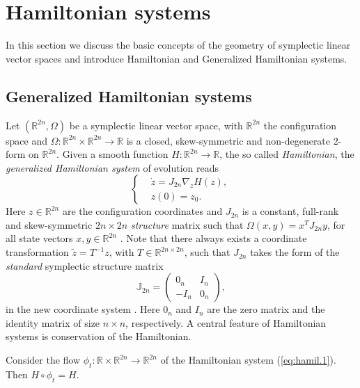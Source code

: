 \section{Hamiltonian systems}
\label{sec:hamil}

In this section we discuss the basic concepts of the geometry of symplectic linear vector spaces and introduce Hamiltonian and Generalized Hamiltonian systems.

\subsection{Generalized Hamiltonian systems}
\label{sec:hamil.1}

Let $(\mathbb R^{2n}, \Omega)$ be a symplectic linear vector space, with $\mathbb R^{2n}$ the configuration space and $\Omega:\mathbb R^{2n}\times\mathbb R^{2n} \to \mathbb R$ is a closed, skew-symmetric and non-degenerate 2-form on $\mathbb R^{2n}$. Given a smooth function $H:\mathbb R^{2n} \to \mathbb R$, the so called \emph{Hamiltonian}, the \emph{generalized Hamiltonian system} of evolution reads
\begin{equation} \label{eq:hamil.1}
\left\{
\begin{aligned}
	& \dot z = J_{2n} \nabla_z H(z),  \\
	&  z(0) = z_0.
\end{aligned}
\right.
\end{equation}
Here $z\in \mathbb R^{2n}$ are the configuration coordinates and $J_{2n}$ is a constant, full-rank and skew-symmetric $2n\times 2n$ \emph{structure} matrix such that $\Omega(x,y) = x^TJ_{2n}y$, for all state vectors $x,y\in \mathbb R^{2n}$ \cite{Marsden:2010:IMS:1965128}. Note that there always exists a coordinate transformation $\tilde z = T^{-1} z$, with $T \in \mathbb R^{2n\times 2n}$, such that $J_{2n}$ takes the form of the \emph{standard} symplectic structure matrix
\begin{equation} \label{eq:hamil.2}
	\mathbb{J}_{2n} = 
	\begin{pmatrix}
	0_n & I_n \\
	-I_n & 0_n
	\end{pmatrix},
\end{equation}
in the new coordinate system \cite{de2006symplectic}.
Here $0_n$ and $I_n$ are the zero matrix and the identity matrix of size $n\times n$, respectively. A central feature of Hamiltonian systems is conservation of the Hamiltonian.

\begin{theorem} \label{thm:1}
\cite{Marsden:2010:IMS:1965128} Consider the flow $\phi_t:\mathbb R \times \mathbb R^{2n} \to \mathbb R^{2n}$ of the Hamiltonian system (\ref{eq:hamil.1}). Then $H \circ \phi_t = H$.
\end{theorem}

